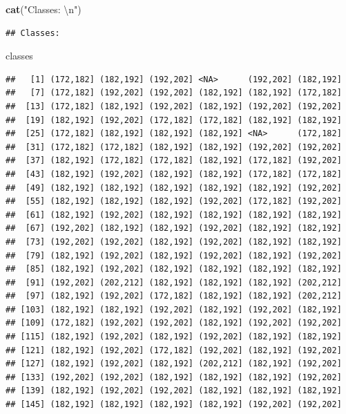 \documentclass[
]{article}
\newenvironment{Shaded}{\begin{snugshade}}{\end{snugshade}}
\newcommand{\CharTok}[1]{\textcolor[rgb]{0.31,0.60,0.02}{#1}}
\newcommand{\KeywordTok}[1]{\textcolor[rgb]{0.13,0.29,0.53}{\textbf{#1}}}
\newcommand{\NormalTok}[1]{#1}
\newcommand{\StringTok}[1]{\textcolor[rgb]{0.31,0.60,0.02}{#1}}
\begin{document}
\begin{Shaded}
\begin{Highlighting}[]
\KeywordTok{cat}\NormalTok{(}\StringTok{"Classes: }\CharTok{\textbackslash{}n}\StringTok{"}\NormalTok{)}
\end{Highlighting}
\end{Shaded}

\begin{verbatim}
## Classes:
\end{verbatim}

\begin{Shaded}
\begin{Highlighting}[]
\NormalTok{classes}
\end{Highlighting}
\end{Shaded}

\begin{verbatim}
##   [1] (172,182] (182,192] (192,202] <NA>      (192,202] (182,192]
##   [7] (172,182] (192,202] (192,202] (182,192] (182,192] (172,182]
##  [13] (172,182] (182,192] (192,202] (182,192] (192,202] (192,202]
##  [19] (182,192] (192,202] (172,182] (172,182] (182,192] (182,192]
##  [25] (172,182] (182,192] (182,192] (182,192] <NA>      (172,182]
##  [31] (172,182] (172,182] (182,192] (182,192] (192,202] (192,202]
##  [37] (182,192] (172,182] (172,182] (182,192] (172,182] (192,202]
##  [43] (182,192] (192,202] (182,192] (182,192] (172,182] (172,182]
##  [49] (182,192] (182,192] (182,192] (182,192] (182,192] (192,202]
##  [55] (182,192] (182,192] (182,192] (192,202] (172,182] (192,202]
##  [61] (182,192] (192,202] (182,192] (182,192] (182,192] (182,192]
##  [67] (192,202] (182,192] (182,192] (192,202] (182,192] (182,192]
##  [73] (192,202] (192,202] (182,192] (192,202] (182,192] (182,192]
##  [79] (182,192] (192,202] (182,192] (192,202] (182,192] (192,202]
##  [85] (182,192] (192,202] (182,192] (182,192] (182,192] (182,192]
##  [91] (192,202] (202,212] (182,192] (182,192] (182,192] (202,212]
##  [97] (182,192] (192,202] (172,182] (182,192] (182,192] (202,212]
## [103] (182,192] (182,192] (192,202] (182,192] (192,202] (182,192]
## [109] (172,182] (192,202] (192,202] (182,192] (192,202] (192,202]
## [115] (182,192] (192,202] (182,192] (192,202] (182,192] (182,192]
## [121] (182,192] (192,202] (172,182] (192,202] (182,192] (192,202]
## [127] (182,192] (192,202] (182,192] (202,212] (182,192] (192,202]
## [133] (192,202] (192,202] (182,192] (182,192] (182,192] (192,202]
## [139] (182,192] (192,202] (192,202] (182,192] (182,192] (182,192]
## [145] (182,192] (182,192] (182,192] (182,192] (192,202] (192,202]

\end{verbatim}
\end{document}
